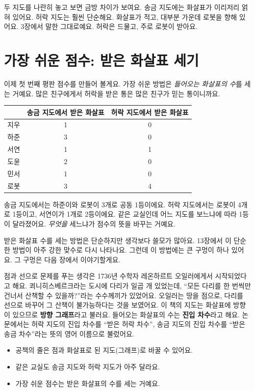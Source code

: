 두 지도를 나란히 놓고 보면 금방 차이가 보여요.
송금 지도에는 화살표가 이리저리 얽혀 있어요.
허락 지도는 훨씬 단순해요.
화살표가 적고, 대부분 가운데 로봇을 향해 있어요.
3장에서 말한 그대로예요.
허락은 드물고, 주로 로봇이 받아요.

\section{가장 쉬운 점수: 받은 화살표 세기}

이제 첫 번째 평판 점수를 만들어 볼게요.
가장 쉬운 방법은 \emph{들어오는 화살표의 수}를 세는 거예요.
많은 친구에게서 허락을 받은 통은 많은 친구가 믿는 통이니까요.

\begin{center}
\small
\begin{tabular}{@{}lcc@{}}
\toprule
& 송금 지도에서 받은 화살표 & 허락 지도에서 받은 화살표 \\
\midrule
지우 & 1 & 0 \\
하준 & 3 & 0 \\
서연 & 1 & 1 \\
도윤 & 2 & 0 \\
민서 & 1 & 0 \\
로봇 & 3 & 4 \\
\bottomrule
\end{tabular}
\end{center}

송금 지도에서는 하준이와 로봇이 3개로 공동 1등이에요.
허락 지도에서는 로봇이 4개로 1등이고, 서연이가 1개로 2등이에요.
같은 교실인데 어느 지도를 보느냐에 따라 1등이 달라졌어요.
\emph{무엇을} 세느냐가 점수의 뜻을 바꾸는 거예요.

받은 화살표 수를 세는 방법은 단순하지만 생각보다 쓸모가 많아요.
13장에서 이 단순한 방법이 아주 강한 맞수로 다시 나타나요.
그런데 이 방법에는 큰 구멍이 하나 있어요.
그 구멍은 다음 장에서 이야기할게요.

\begin{deeper}[그래프의 역사]
점과 선으로 문제를 푸는 생각은 1736년 수학자 레온하르트 오일러에게서 시작되었다고 해요.
쾨니히스베르크라는 도시에 다리가 일곱 개 있었는데,
“모든 다리를 한 번씩만 건너서 산책할 수 있을까?”라는 수수께끼가 있었어요.
오일러는 땅을 점으로, 다리를 선으로 바꾸어 그 산책이 불가능하다는 것을 보였어요.
이 책의 지도는 화살표에 방향이 있으므로 \textbf{방향 그래프}라고 불러요.
들어오는 화살표의 수는 \textbf{진입 차수}라고 해요.
논문에서는 허락 지도의 진입 차수를 “받은 허락 차수”, 송금 지도의 진입 차수를 “받은 송금 차수”라는 뜻의 영어 이름으로 불렀어요.
\end{deeper}

\begin{learned}
\begin{itemize}
\item 공책의 줄은 점과 화살표로 된 지도(그래프)로 바꿀 수 있어요.
\item 같은 교실도 송금 지도와 허락 지도가 아주 달라요.
\item 가장 쉬운 점수는 받은 화살표의 수를 세는 거예요.
\end{itemize}
\end{learned}
